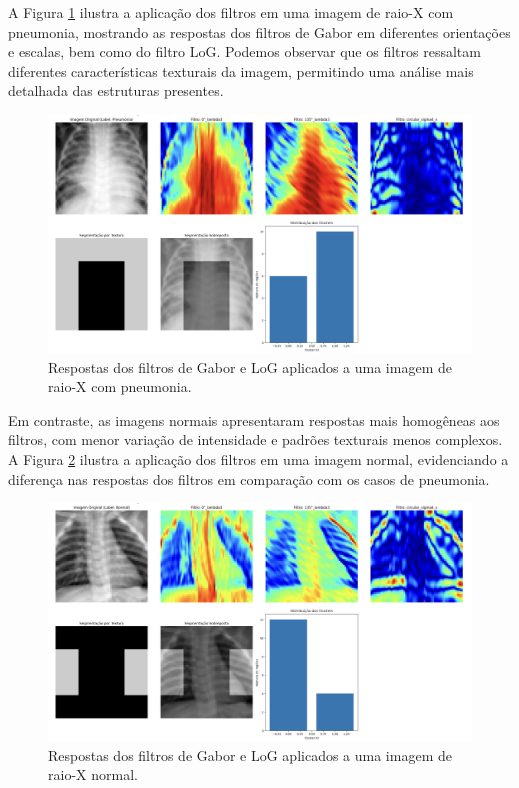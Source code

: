 \documentclass[sigconf,nonacm]{acmart}
\begin{document}
A Figura \ref{fig:filtros_pneumonia} ilustra a aplicação dos filtros em uma imagem de raio-X com pneumonia, mostrando as respostas dos filtros de Gabor em diferentes orientações e escalas, bem como do filtro LoG. Podemos observar que os filtros ressaltam diferentes características texturais da imagem, permitindo uma análise mais detalhada das estruturas presentes.
\begin{figure}[h]
  \centering
  \includegraphics[width=1\linewidth]{../images/filtros_pneumonia.png}
  \caption{Respostas dos filtros de Gabor e LoG aplicados a uma imagem de raio-X com pneumonia.}
  \label{fig:filtros_pneumonia}
\end{figure}

Em contraste, as imagens normais apresentaram respostas mais homogêneas aos filtros, com menor variação de intensidade e padrões texturais menos complexos. A Figura \ref{fig:filtros_normal} ilustra a aplicação dos filtros em uma imagem normal, evidenciando a diferença nas respostas dos filtros em comparação com os casos de pneumonia.

\begin{figure}[h]
  \centering
  \includegraphics[width=1\linewidth]{../images/filtros_normal.png}
  \caption{Respostas dos filtros de Gabor e LoG aplicados a uma imagem de raio-X normal.}
  \label{fig:filtros_normal}
\end{figure}
\end{document}
